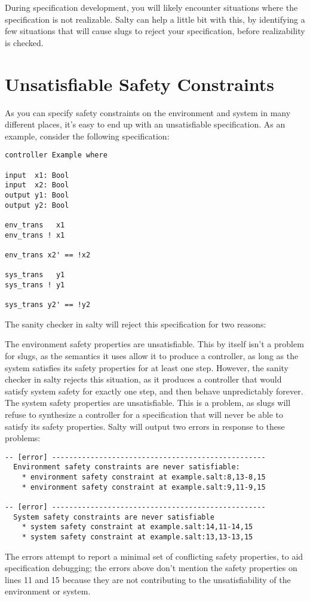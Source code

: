 During specification development, you will likely encounter situations where the specification is not realizable. Salty can help a little bit with this, by identifying a few situations that will cause slugs to reject your specification, before realizability is checked.

\section{Unsatisfiable Safety Constraints}

As you can specify safety constraints on the environment and system in many different places, it's easy to end up with an unsatisfiable specification. As an example, consider the following specification:

\begin{lstlisting}
controller Example where

input  x1: Bool
input  x2: Bool
output y1: Bool
output y2: Bool

env_trans   x1
env_trans ! x1

env_trans x2' == !x2

sys_trans   y1
sys_trans ! y1

sys_trans y2' == !y2
\end{lstlisting}
The sanity checker in salty will reject this specification for two reasons:

The environment safety properties are unsatisfiable. This by itself isn't a problem for slugs, as the semantics it uses allow it to produce a controller, as long as the system satisfies its safety properties for at least one step. However, the sanity checker in salty rejects this situation, as it produces a controller that would satisfy system safety for exactly one step, and then behave unpredictably forever.
The system safety properties are unsatisfiable. This is a problem, as slugs will refuse to synthesize a controller for a specification that will never be able to satisfy its safety properties.
Salty will output two errors in response to these problems:
\begin{lstlisting}
-- [error] --------------------------------------------------
  Environment safety constraints are never satisfiable:
    * environment safety constraint at example.salt:8,13-8,15
    * environment safety constraint at example.salt:9,11-9,15

-- [error] --------------------------------------------------
  System safety constraints are never satisfiable
    * system safety constraint at example.salt:14,11-14,15
    * system safety constraint at example.salt:13,13-13,15
\end{lstlisting}
The errors attempt to report a minimal set of conflicting safety properties, to aid specification debugging; the errors above don't mention the safety properties on lines 11 and 15 because they are not contributing to the unsatisfiability of the environment or system.

